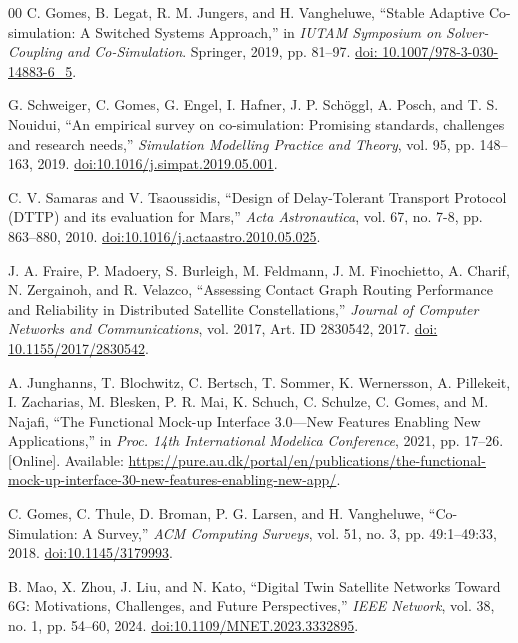 \documentclass[a4paper,fleqn]{cas-sc}
\begin{document}
\begin{thebibliography}{00}
 C. Gomes, B. Legat, R. M. Jungers, and H. Vangheluwe, ``Stable Adaptive Co-simulation: A Switched Systems Approach,'' in \textit{IUTAM Symposium on Solver-Coupling and Co-Simulation}. Springer, 2019, pp. 81--97. \href{https://doi.org/10.1007/978-3-030-14883-6_5}{doi: 10.1007/978-3-030-14883-6\_5}.

 G. Schweiger, C. Gomes, G. Engel, I. Hafner, J. P. Sch\"oggl, A. Posch, and T. S. Nouidui, ``An empirical survey on co-simulation: Promising standards, challenges and research needs,'' \textit{Simulation Modelling Practice and Theory}, vol. 95, pp. 148--163, 2019. \href{https://doi.org/10.1016/j.simpat.2019.05.001}{doi:10.1016/j.simpat.2019.05.001}.

 C. V. Samaras and V. Tsaoussidis, ``Design of Delay-Tolerant Transport Protocol (DTTP) and its evaluation for Mars,'' \textit{Acta Astronautica}, vol. 67, no. 7-8, pp. 863--880, 2010. \href{https://doi.org/10.1016/j.actaastro.2010.05.025}{doi:10.1016/j.actaastro.2010.05.025}.

 J. A. Fraire, P. Madoery, S. Burleigh, M. Feldmann, J. M. Finochietto, A. Charif, N. Zergainoh, and R. Velazco, ``Assessing Contact Graph Routing Performance and Reliability in Distributed Satellite Constellations,'' \textit{Journal of Computer Networks and Communications}, vol. 2017, Art. ID 2830542, 2017. \href{https://doi.org/10.1155/2017/2830542}{doi: 10.1155/2017/2830542}.

 A. Junghanns, T. Blochwitz, C. Bertsch, T. Sommer, K. Wernersson, A. Pillekeit, I. Zacharias, M. Blesken, P. R. Mai, K. Schuch, C. Schulze, C. Gomes, and M. Najafi, ``The Functional Mock-up Interface 3.0---New Features Enabling New Applications,'' in \textit{Proc. 14th International Modelica Conference}, 2021, pp. 17--26. [Online]. Available: \url{https://pure.au.dk/portal/en/publications/the-functional-mock-up-interface-30-new-features-enabling-new-app/}.

 C. Gomes, C. Thule, D. Broman, P. G. Larsen, and H. Vangheluwe, ``Co-Simulation: A Survey,'' \textit{ACM Computing Surveys}, vol. 51, no. 3, pp. 49:1--49:33, 2018. \href{https://doi.org/10.1145/3179993}{doi:10.1145/3179993}.

 B. Mao, X. Zhou, J. Liu, and N. Kato, ``Digital Twin Satellite Networks Toward 6G: Motivations, Challenges, and Future Perspectives,'' \textit{IEEE Network}, vol. 38, no. 1, pp. 54--60, 2024. \href{https://doi.org/10.1109/MNET.2023.3332895}{doi:10.1109/MNET.2023.3332895}.


\end{thebibliography}
\end{document}
